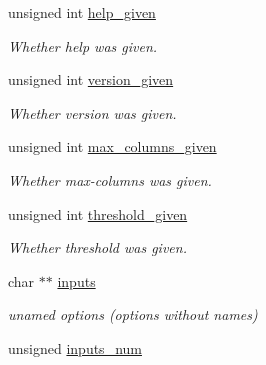 \begin{DoxyCompactItemize}
unsigned int \hyperlink{structgengetopt__args__info_ab9fd677f890731fd7d6f6c62e6dfc99c}{help\+\_\+given}
\begin{DoxyCompactList}\small\item\em Whether help was given. \end{DoxyCompactList}\item 
\mbox{\label{structgengetopt__args__info_ad4953a2130b2f8b94a3a687014f278e1}} 
unsigned int \hyperlink{structgengetopt__args__info_ad4953a2130b2f8b94a3a687014f278e1}{version\+\_\+given}
\begin{DoxyCompactList}\small\item\em Whether version was given. \end{DoxyCompactList}\item 
\mbox{\label{structgengetopt__args__info_aae6f29085fe186563d467ddeaeefcd02}} 
unsigned int \hyperlink{structgengetopt__args__info_aae6f29085fe186563d467ddeaeefcd02}{max\+\_\+columns\+\_\+given}
\begin{DoxyCompactList}\small\item\em Whether max-\/columns was given. \end{DoxyCompactList}\item 
\mbox{\label{structgengetopt__args__info_af3c0d3a8ba113f0eeacf8f09c79416d2}} 
unsigned int \hyperlink{structgengetopt__args__info_af3c0d3a8ba113f0eeacf8f09c79416d2}{threshold\+\_\+given}
\begin{DoxyCompactList}\small\item\em Whether threshold was given. \end{DoxyCompactList}\item 
\mbox{\label{structgengetopt__args__info_a6fe9c1a32bc4c64a2ca4e3cfce05b147}} 
char $\ast$$\ast$ \hyperlink{structgengetopt__args__info_a6fe9c1a32bc4c64a2ca4e3cfce05b147}{inputs}
\begin{DoxyCompactList}\small\item\em unamed options (options without names) \end{DoxyCompactList}\item 
\mbox{\label{structgengetopt__args__info_a3d69c180d5ac0b1124fd9a6fe680706c}} 
unsigned \hyperlink{structgengetopt__args__info_a3d69c180d5ac0b1124fd9a6fe680706c}{inputs\+\_\+num}
$$
\end{DoxyCompactItemize}
